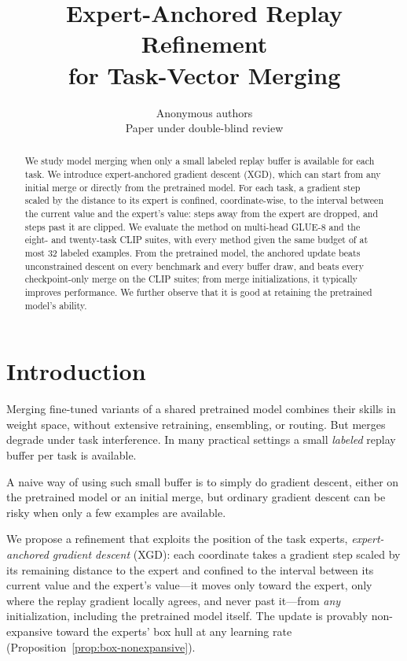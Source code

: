 \documentclass{article} %
\title{Expert-Anchored Replay Refinement \\ for Task-Vector Merging}
\author{Anonymous authors \\
Paper under double-blind review}
\begin{document}
\maketitle

\begin{abstract}
We study model merging when only a small labeled replay buffer is available for each task.
We introduce expert-anchored gradient descent (XGD), which can start from any initial merge or directly from the pretrained model.
For each task, a gradient step scaled by the distance to its expert is confined, coordinate-wise, to the interval between the current value and the expert's value: steps away from the expert are dropped, and steps past it are clipped. We evaluate the method on multi-head GLUE-8 and the eight- and twenty-task CLIP suites, with every method given the same budget of at most 32 labeled examples. From the pretrained model, the anchored update beats unconstrained descent on every benchmark and every buffer draw, and beats every checkpoint-only merge on the CLIP suites; from merge initializations, it typically improves performance. We further observe that it is good at retaining the pretrained model's ability.
\end{abstract}
\section{Introduction}
\label{sec:intro}
Merging fine-tuned variants of a shared pretrained model combines their skills in weight space, without extensive retraining, ensembling, or routing. But merges degrade under task interference. In many practical settings a small \emph{labeled} replay buffer per task is available.

A naive way of using such small buffer is to simply do gradient descent, either on the pretrained model or an initial merge, but ordinary gradient descent can be risky when only a few examples are available. 

We propose a refinement that exploits the position of the task experts, \emph{expert-anchored gradient descent} (XGD): each coordinate takes a gradient step scaled by its remaining distance to the expert and confined to the interval between its current value and the expert's value---it moves only toward the expert, only where the replay gradient locally agrees, and never past it---from \emph{any} initialization, including the pretrained model itself. The update is provably non-expansive toward the experts' box hull at any learning rate (Proposition~\ref{prop:box-nonexpansive}).
\end{document}
